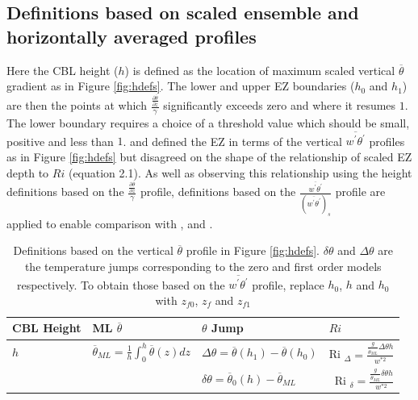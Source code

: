 \documentclass[referee]{svjour3}
\begin{document}
\subsection{Definitions based on scaled ensemble and horizontally averaged profiles}

Here the CBL height ($h$) is defined as the location of maximum scaled vertical $\overline{\theta}$ gradient as in Figure \ref{fig:hdefs}.  The lower and upper EZ boundaries ($h_{0}$ and $h_{1}$) are then the points at which $\frac{\frac{\partial \overline{\theta}}{\partial z}}{\gamma}$ significantly exceeds zero and where it resumes $1$.  The lower boundary requires a choice of a threshold value which should be small, positive and less than $1$. \cite{FedConzMir04} and \cite{BrooksFowler2} defined the EZ in terms of the vertical $\overline{w^{'}\theta^{'}}$ profiles as in Figure \ref{fig:hdefs} but disagreed on the shape of the relationship of scaled EZ depth to $Ri$ (equation 2.1).  As well as observing this relationship using the height definitions based on the $\frac{\frac{\partial \overline{\theta}}{\partial z}}{\gamma}$ profile, definitions based on the $\frac{\overline{w^{'}\theta^{'}}}{(\overline{w^{'}\theta^{'}})_{s}}$ profile are applied to enable comparison with \cite{BrooksFowler2}, \cite{FedConzMir04} and \cite{GarciaMellado}.\\  

\begin{table}[htbp]
\caption[Height definitions]{Definitions based on the vertical $\overline{\theta}$ profile in Figure \ref{fig:hdefs}. $\delta \theta$ and $\Delta \theta$ are the temperature jumps corresponding to the zero and first order models respectively. To obtain those based on the $\overline{w^{'}\theta^{'}}$ profile, replace $h_{0}$, $h$ and $h_{0}$ with $z_{f0}$, $z_{f}$ and $z_{f1}$}


    \begin{tabular}{p{} p{} p{3cm} p{2.5cm}}
    
      CBL Height & ML $\overline{\theta}$ & $\theta$ Jump &$     Ri $\\ \hline 
       $h$ & $\overline{\theta}_{ML} = \frac{1}{h}\int^{h}_{0}\overline{\theta}(z)dz$ & $\Delta \theta=\overline{\theta}(h_{1})-\overline{\theta}(h_{0})$ &      Ri $_{\Delta}=\frac{\frac{g}{\overline{\theta}_{ML}}\Delta \theta h}{w^{*2}}$  \\ [.3cm] 
        
       & &$\delta \theta = \overline{\theta}_{0}(h)- \overline{\theta}_{ML}$ & \    Ri $_{\delta}=\frac{\frac{g}{\overline{\theta}_{ML}} \delta \theta h}{w^{*2}}$ \\ \hline
      \end{tabular}

\label{tab:reldefs}   
    
\end{table}
\end{document}
